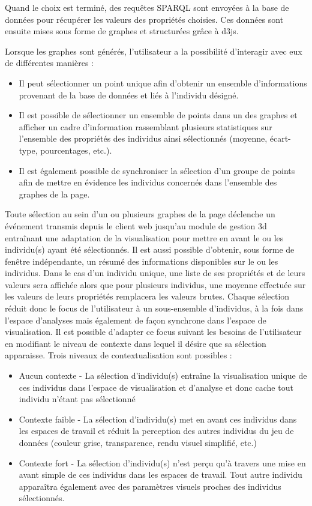 Quand le choix est terminé, des requêtes SPARQL sont envoyées à la base de données pour récupérer les valeurs des propriétés choisies. Ces données sont ensuite mises sous forme de graphes et structurées grâce à d3js.

Lorsque les graphes sont générés, l'utilisateur a la possibilité d'interagir avec eux de différentes manières : 
\begin{itemize}
  \item Il peut sélectionner un point unique afin d'obtenir un ensemble d'informations provenant de la base de données et liés à l'individu désigné.
  \item Il est possible de sélectionner un ensemble de points dans un des graphes et afficher un cadre d'information rassemblant plusieurs statistiques sur l'ensemble des propriétés des individus ainsi sélectionnés (moyenne, écart-type, pourcentages, etc.).
  \item Il est également possible de synchroniser la sélection d'un groupe de points afin de mettre en évidence les individus concernés dans l'ensemble des graphes de la page.
\end{itemize}

Toute sélection au sein d'un ou plusieurs graphes de la page déclenche un événement transmis depuis le client web jusqu'au module de gestion 3d entraînant une adaptation de la visualisation pour mettre en avant le ou les individu(s) ayant été sélectionnés. Il est aussi possible d'obtenir, sous forme de fenêtre indépendante, un résumé des informations disponibles sur le ou les individus. Dans le cas d'un individu unique, une liste de ses propriétés et de leurs valeurs sera affichée alors que pour plusieurs individus, une moyenne effectuée sur les valeurs de leurs propriétés remplacera les valeurs brutes.
Chaque sélection réduit donc le focus de l'utilisateur à un sous-ensemble d'individus, à la fois dans l'espace d'analyses mais également de façon synchrone dans l'espace de visualisation. Il est possible d'adapter ce focus suivant les besoins de l'utilisateur en modifiant le niveau de contexte dans lequel il désire que sa sélection apparaisse. Trois niveaux de contextualisation sont possibles :
\begin{itemize}
  \item Aucun contexte - La sélection d'individu(s) entraîne la visualisation unique de ces individus dans l'espace de visualisation et d'analyse et donc cache tout individu n'étant pas sélectionné
  \item Contexte faible - La sélection d'individu(s) met en avant ces individus dans les espaces de travail et réduit la perception des autres individus du jeu de données (couleur grise, transparence, rendu visuel simplifié, etc.)
  \item Contexte fort - La sélection d'individu(s) n'est perçu qu'à travers une mise en avant simple de ces individus dans les espaces de travail. Tout autre individu apparaîtra également avec des paramètres visuels proches des individus sélectionnés.
\end{itemize}

